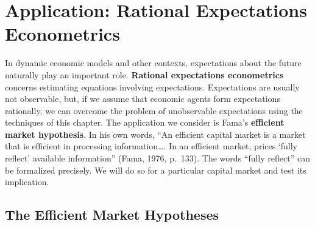 
\section{Application: Rational Expectations Econometrics}
\label{sec:2.11}

In dynamic economic models and other contexts, expectations about the future
naturally play an important role. \textbf{Rational expectations econometrics} concerns
estimating equations involving expectations. Expectations are usually not observable, but, if we assume that economic agents form expectations rationally, we can
overcome the problem of unobservable expectations using the techniques of this
chapter. The application we consider is Fama's \textbf{efficient market hypothesis}. In
his own words, ``An efficient capital market is a market that is efficient in processing
information\ldots. In an efficient market, prices `fully reflect' available information''
(Fama, 1976, p.~133). The words ``fully reflect'' can be formalized precisely. We
will do so for a particular capital market and test its implication.

\subsection*{The Efficient Market Hypotheses}

